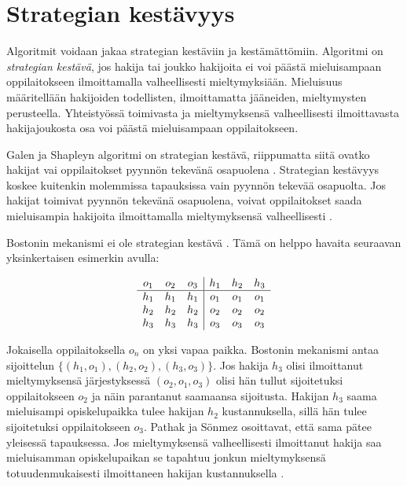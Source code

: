 \documentclass[gradu, twoside]{tktltiki}
\begin{document}
\section{Strategian kestävyys}

Algoritmit voidaan jakaa strategian kestäviin ja kestämättömiin.
Algoritmi on \emph{strategian kestävä}, jos hakija tai joukko
hakijoita ei voi päästä mieluisampaan oppilaitokseen ilmoittamalla
valheellisesti mieltymyksiään. Mieluisuus määritellään hakijoiden
todellisten, ilmoittamatta jääneiden, mieltymysten perusteella.
Yhteistyössä toimivasta ja mieltymyksensä valheellisesti ilmoittavasta
hakijajoukosta osa voi päästä mieluisampaan oppilaitokseen.

Galen ja Shapleyn algoritmi on strategian kestävä, riippumatta siitä
ovatko hakijat vai oppilaitokset pyynnön tekevänä osapuolena
\cite{dubins81}. Strategian kestävyys koskee kuitenkin molemmissa
tapauksissa vain pyynnön tekevää osapuolta. Jos hakijat toimivat
pyynnön tekevänä osapuolena, voivat oppilaitokset saada mieluisampia
hakijoita ilmoittamalla mieltymyksensä valheellisesti \cite{dubins81}.

Bostonin mekanismi ei ole strategian kestävä \cite{abdusön03}. Tämä on
helppo havaita seuraavan yksinkertaisen esimerkin avulla:

\[
  \begin{array}{c c c}
    o_1 & o_2 & o_3 \\
    \hline
    h_1 & h_1 & h_1 \\
    h_2 & h_2 & h_2 \\
    h_3 & h_3 & h_3
  \end{array}
  \begin{array}{|c c c}
    h_1 & h_2 & h_3 \\
    \hline
    o_1 & o_1 & o_1 \\
    o_2 & o_2 & o_2 \\
    o_3 & o_3 & o_3
  \end{array}
\]

Jokaisella oppilaitoksella $o_n$ on yksi vapaa paikka. Bostonin
mekanismi antaa sijoittelun $\{(h_1, o_1), (h_2, o_2), (h_3, o_3)\}$.
Jos hakija $h_3$ olisi ilmoittanut mieltymyksensä järjestyksessä
$(o_2, o_1, o_3)$ olisi hän tullut sijoitetuksi oppilaitokseen $o_2$
ja näin parantanut saamaansa sijoitusta. Hakijan $h_3$ saama
mieluisampi opiskelupaikka tulee hakijan $h_2$ kustannuksella, sillä
hän tulee sijoitetuksi oppilaitokseen $o_3$. Pathak ja Sönmez
osoittavat, että sama pätee yleisessä tapauksessa. Jos mieltymyksensä
valheellisesti ilmoittanut hakija saa mieluisamman opiskelupaikan se
tapahtuu jonkun mieltymyksensä totuudenmukaisesti ilmoittaneen hakijan
kustannuksella \cite{pathak08}.
\end{document}
